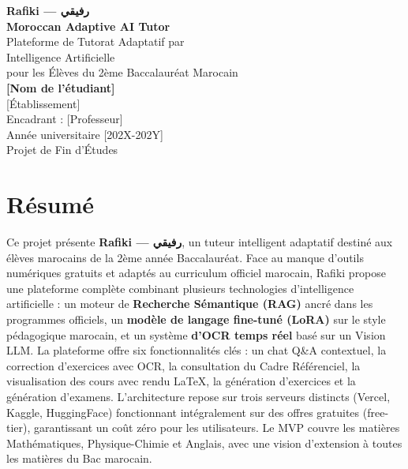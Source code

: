 \documentclass[12pt,a4paper]{report}
\begin{document}
\begin{titlepage}
    \centering
    \vspace*{3cm}
    {\Huge\textbf{Rafiki — رفيقي}}\\[0.5cm]
    {\Huge\textbf{Moroccan Adaptive AI Tutor}}\\[1.5cm]
    {\LARGE Plateforme de Tutorat Adaptatif par\\ Intelligence Artificielle\\ pour les Élèves du 2ème Baccalauréat Marocain}\\[2cm]
    \vfill
    {\large \textbf{[Nom de l'étudiant]}}\\[0.5cm]
    {\large [Établissement]}\\[0.5cm]
    {\large Encadrant : [Professeur]}\\[0.5cm]
    {\large Année universitaire [202X-202Y]}\\[0.5cm]
    {\large \textcolor{grisous titre}{Projet de Fin d'Études}}\\[1cm]
    \vspace{2cm}
\end{titlepage}

\chapter*{Résumé}

Ce projet présente \textbf{Rafiki — رفيقي}, un tuteur intelligent adaptatif destiné aux élèves marocains de la 2ème année Baccalauréat. Face au manque d'outils numériques gratuits et adaptés au curriculum officiel marocain, Rafiki propose une plateforme complète combinant plusieurs technologies d'intelligence artificielle : un moteur de \textbf{Recherche Sémantique (RAG)} ancré dans les programmes officiels, un \textbf{modèle de langage fine-tuné (LoRA)} sur le style pédagogique marocain, et un système \textbf{d'OCR temps réel} basé sur un Vision LLM. La plateforme offre six fonctionnalités clés : un chat Q\&A contextuel, la correction d'exercices avec OCR, la consultation du Cadre Référenciel, la visualisation des cours avec rendu LaTeX, la génération d'exercices et la génération d'examens. L'architecture repose sur trois serveurs distincts (Vercel, Kaggle, HuggingFace) fonctionnant intégralement sur des offres gratuites (free-tier), garantissant un coût zéro pour les utilisateurs. Le MVP couvre les matières Mathématiques, Physique-Chimie et Anglais, avec une vision d'extension à toutes les matières du Bac marocain.
\end{document}
